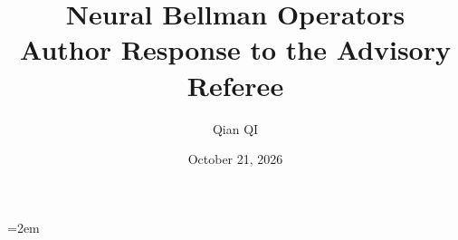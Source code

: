 \documentclass[11pt]{article}
\title{Neural Bellman Operators\\Author Response to the Advisory Referee}
\author{Qian QI}
\date{October 21, 2026}
\begin{document}
\emergencystretch=2em
\maketitle

\end{document}
